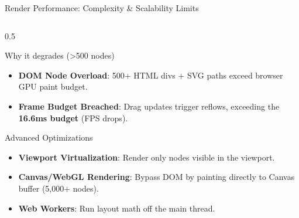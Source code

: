 \documentclass[aspectratio=169, 10pt]{beamer}
\begin{document}
\begin{frame}{Render Performance: Complexity \& Scalability Limits}
\begin{columns}
    \begin{column}{0.5\textwidth}
      \begin{block}{Why it degrades (>500 nodes)}
        \begin{itemize}
          \item \textbf{DOM Node Overload}: 500+ HTML divs + SVG paths exceed browser GPU paint budget.
          \item \textbf{Frame Budget Breached}: Drag updates trigger reflows, exceeding the \textbf{16.6ms budget} (FPS drops).
        \end{itemize}
      \end{block}
      \vspace{-0.2em}
      \begin{block}{Advanced Optimizations}
        \begin{itemize}
          \item \textbf{Viewport Virtualization}: Render only nodes visible in the viewport.
          \item \textbf{Canvas/WebGL Rendering}: Bypass DOM by painting directly to Canvas buffer (5,000+ nodes).
          \item \textbf{Web Workers}: Run layout math off the main thread.
        \end{itemize}
      \end{block}
    \end{column}
  \end{columns}
\end{frame}
\end{document}
